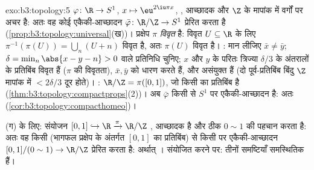 \begin{solution}{exo:b3:topology:5}
$\varphi \colon \R \to S^1$, $x \mapsto \eu^{2\iu\pi x}$, , आच्छादक और $\Z$ के मापांक में वर्गों पर अचर है:
अतः वह कोई  एकैकी-आच्छादन $\bar\varphi \colon \R/\Z \to
S^1$ प्रेरित करता है (\cref{prop:b3:topology:universal}(ख))। प्रक्षेप
$\pi$ \emph{विवृत} है: विवृत $U \subseteq \R$ के लिए $\pi^{-1}(\pi(U)) = \bigcup_{n}(U + n)$ विवृत है, अतः $\pi(U)$
विवृत है। : मान लीजिए $\bar x \neq \bar y$; $\delta = \min_{n}\abs{x - y - n} > 0$ वाले प्रतिनिधि चुनिए;
$x$ और $y$ के परितः त्रिज्या $\delta/3$ के अंतरालों के प्रतिबिंब
विवृत हैं ($\pi$ की विवृतता), $\bar x, \bar y$ को धारण करते हैं, और असंयुक्त
हैं (दो पूर्व-प्रतिबिंब बिंदु $\Z$ मापांक में $< 2\delta/3$ दूर होते)। :
$\R/\Z = \pi([0,1])$, जो किसी  का  प्रतिबिंब है (\cref{thm:b3:topology:compactprops}(2))। अब $\bar\varphi$
किसी  से  $S^1$ पर  एकैकी-आच्छादन है: अतः
 (\cref{cor:b3:topology:compacthomeo})।

(ग) के लिए: संयोजन $[0,1] \hookrightarrow \R
\xrightarrow{\pi} \R/\Z$ , आच्छादक है और ठीक $0 \sim 1$ की पहचान
करता है: अतः वह किसी  (भागफल प्रक्षेप के अंतर्गत $[0,1]$
का  प्रतिबिंब) से किसी  पर  एकैकी-आच्छादन
$[0,1]/(0\sim1) \to \R/\Z$ प्रेरित करता है: अर्थात् । संयोजित करने पर: तीनों
समष्टियाँ समस्थितिक हैं।
\end{solution}

